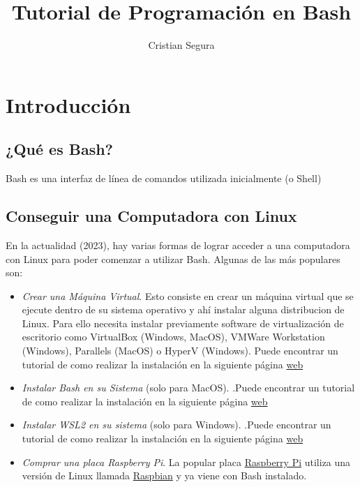 \documentclass[10pt,letterpaper]{article}
\title{Tutorial de Programación en Bash}
\author{Cristian Segura}
\begin{document}
\maketitle
\tableofcontents

\section{Introducción}
\subsection{¿Qué es Bash?}
Bash es una interfaz de línea de comandos utilizada inicialmente (o Shell)

\subsection{Conseguir una Computadora con Linux}
En la actualidad (2023), hay varias formas de lograr acceder a una computadora con Linux para 
poder comenzar a utilizar Bash.
Algunas de las más populares son:

\begin{itemize}
	\item \textit{Crear una Máquina Virtual}. Esto consiste en crear un máquina virtual que se ejecute dentro de su sistema operativo y ahí instalar alguna distribucion de Linux. Para ello necesita instalar previamente software de virtualización de escritorio como VirtualBox (Windows, MacOS), VMWare Workstation (Windows), Parallels (MacOS) o HyperV (Windows). Puede encontrar un tutorial de como realizar la instalación en la siguiente página \href{http://url.com/instalar-ubuntu-22-virtualbox-windows}{web}
	
	\item \textit{Instalar Bash en su Sistema} (solo para MacOS). .Puede encontrar un tutorial de como realizar la instalación en la siguiente página \href{http://url.com/bash-en-macos}{web}
	
	\item \textit{Instalar WSL2 en su sistema} (solo para Windows). .Puede encontrar un tutorial de como realizar la instalación en la siguiente página \href{http://url.com/instalar-wsl2}{web}
	
	\item \textit{Comprar una placa Raspberry Pi}. La popular placa \href{https://www.raspberrypi.org/}{Raspberry Pi} utiliza una versión de Linux llamada \href{https://www.raspberrypi.com/software/operating-systems/}{Raspbian} y ya viene con Bash instalado.
\end{itemize}
\end{document}
